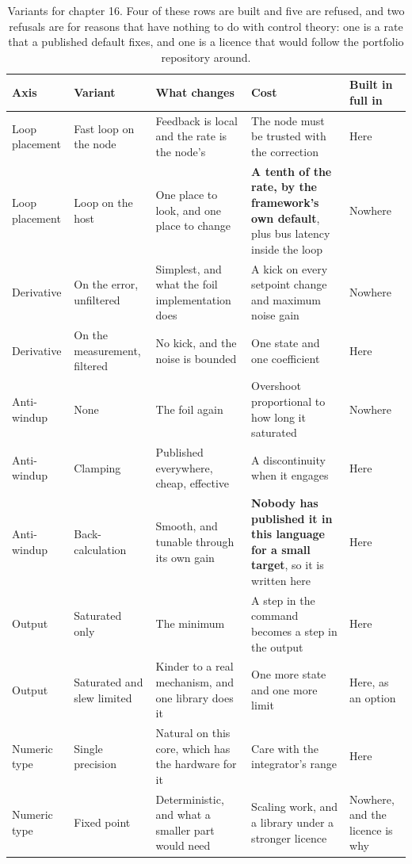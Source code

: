 \begin{table}[H]\centering\small
\begin{tabular}{p{24mm}p{26mm}p{44mm}p{22mm}p{20mm}}
\toprule
Axis & Variant & What changes & Cost & Built in full in \\
\midrule
Loop placement & Fast loop on the node & Feedback is local and the rate is the node's & The node must be trusted with the correction & Here \\
Loop placement & Loop on the host & One place to look, and one place to change & \textbf{A tenth of the rate, by the framework's own default}, plus bus latency inside the loop & Nowhere \\
Derivative & On the error, unfiltered & Simplest, and what the foil implementation does & A kick on every setpoint change and maximum noise gain & Nowhere \\
Derivative & On the measurement, filtered & No kick, and the noise is bounded & One state and one coefficient & Here \\
Anti-windup & None & The foil again & Overshoot proportional to how long it saturated & Nowhere \\
Anti-windup & Clamping & Published everywhere, cheap, effective & A discontinuity when it engages & Here \\
Anti-windup & Back-calculation & Smooth, and tunable through its own gain & \textbf{Nobody has published it in this language for a small target}, so it is written here & Here \\
Output & Saturated only & The minimum & A step in the command becomes a step in the output & Here \\
Output & Saturated and slew limited & Kinder to a real mechanism, and one library does it & One more state and one more limit & Here, as an option \\
Numeric type & Single precision & Natural on this core, which has the hardware for it & Care with the integrator's range & Here \\
Numeric type & Fixed point & Deterministic, and what a smaller part would need & Scaling work, and a library under a stronger licence & Nowhere, and the licence is why \\
\bottomrule
\end{tabular}
\caption{Variants for chapter 16. Four of these rows are built and five are refused, and two refusals are for reasons that have nothing to do with control theory: one is a rate that a published default fixes, and one is a licence that would follow the portfolio repository around.}
\end{table}

